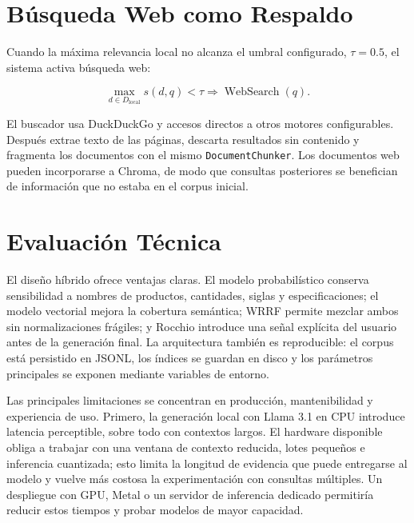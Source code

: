 \documentclass[a4paper]{llncs}
\begin{document}
\section{Búsqueda Web como Respaldo}

Cuando la máxima relevancia local no alcanza el umbral configurado, $\tau=0.5$, el sistema activa búsqueda web:

\begin{equation}
\max_{d\in D_{\mathrm{local}}}s(d,q)<\tau
\Longrightarrow
\operatorname{WebSearch}(q).
\end{equation}

El buscador usa DuckDuckGo y accesos directos a otros motores configurables. Después extrae texto de las páginas, descarta resultados sin contenido y fragmenta los documentos con el mismo \texttt{DocumentChunker}. Los documentos web pueden incorporarse a Chroma, de modo que consultas posteriores se benefician de información que no estaba en el corpus inicial.

\section{Evaluación Técnica}

El diseño híbrido ofrece ventajas claras. El modelo probabilístico conserva sensibilidad a nombres de productos, cantidades, siglas y especificaciones; el modelo vectorial mejora la cobertura semántica; WRRF permite mezclar ambos sin normalizaciones frágiles; y Rocchio introduce una señal explícita del usuario antes de la generación final. La arquitectura también es reproducible: el corpus está persistido en JSONL, los índices se guardan en disco y los parámetros principales se exponen mediante variables de entorno.

Las principales limitaciones se concentran en producción, mantenibilidad y experiencia de uso. Primero, la generación local con Llama 3.1 en CPU introduce latencia perceptible, sobre todo con contextos largos. El hardware disponible obliga a trabajar con una ventana de contexto reducida, lotes pequeños e inferencia cuantizada; esto limita la longitud de evidencia que puede entregarse al modelo y vuelve más costosa la experimentación con consultas múltiples. Un despliegue con GPU, Metal o un servidor de inferencia dedicado permitiría reducir estos tiempos y probar modelos de mayor capacidad.
\end{document}
